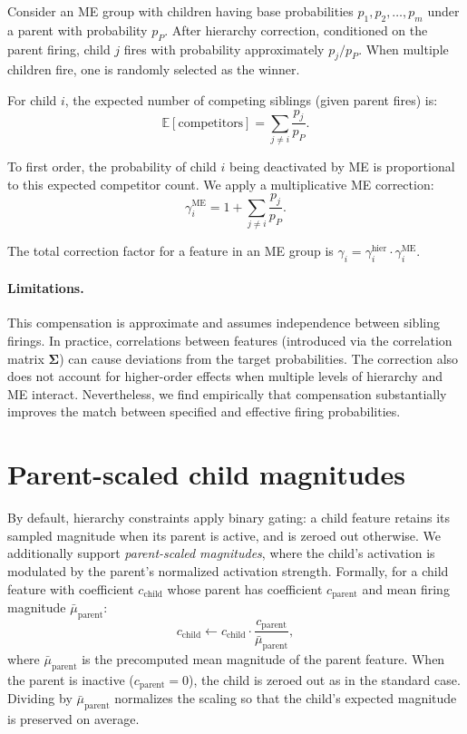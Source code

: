 \documentclass{article}
\theoremstyle{plain}
\theoremstyle{definition}
\theoremstyle{remark}
\begin{document}
Consider an ME group with children having base probabilities $p_1, p_2, \ldots, p_m$ under a parent with probability $p_P$. After hierarchy correction, conditioned on the parent firing, child $j$ fires with probability approximately $p_j / p_P$. When multiple children fire, one is randomly selected as the winner.

For child $i$, the expected number of competing siblings (given parent fires) is:
\begin{equation}
    \mathbb{E}[\text{competitors}] = \sum_{j \neq i} \frac{p_j}{p_P}.
\end{equation}

To first order, the probability of child $i$ being deactivated by ME is proportional to this expected competitor count. We apply a multiplicative ME correction:
\begin{equation}
    \gamma_i^{\text{ME}} = 1 + \sum_{j \neq i} \frac{p_j}{p_P}.
\end{equation}

The total correction factor for a feature in an ME group is $\gamma_i = \gamma_i^{\text{hier}} \cdot \gamma_i^{\text{ME}}$.

\paragraph{Limitations.} This compensation is approximate and assumes independence between sibling firings. In practice, correlations between features (introduced via the correlation matrix $\boldsymbol{\Sigma}$) can cause deviations from the target probabilities. The correction also does not account for higher-order effects when multiple levels of hierarchy and ME interact. Nevertheless, we find empirically that compensation substantially improves the match between specified and effective firing probabilities.

\section{Parent-scaled child magnitudes}
\label{apx:parent-scaling}

By default, hierarchy constraints apply binary gating: a child feature retains its sampled magnitude when its parent is active, and is zeroed out otherwise. We additionally support \emph{parent-scaled magnitudes}, where the child's activation is modulated by the parent's normalized activation strength. Formally, for a child feature with coefficient $c_{\text{child}}$ whose parent has coefficient $c_{\text{parent}}$ and mean firing magnitude $\bar{\mu}_{\text{parent}}$:
\begin{equation}
    c_{\text{child}} \leftarrow c_{\text{child}} \cdot \frac{c_{\text{parent}}}{\bar{\mu}_{\text{parent}}},
\end{equation}
where $\bar{\mu}_{\text{parent}}$ is the precomputed mean magnitude of the parent feature. When the parent is inactive ($c_{\text{parent}} = 0$), the child is zeroed out as in the standard case. Dividing by $\bar{\mu}_{\text{parent}}$ normalizes the scaling so that the child's expected magnitude is preserved on average.
\end{document}
